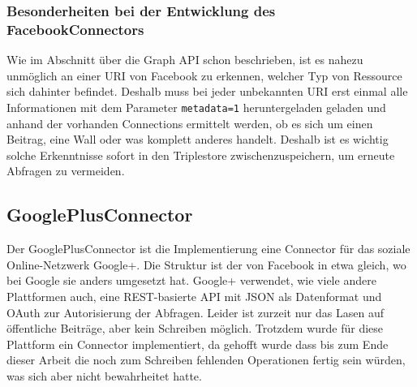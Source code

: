 
\subsubsection{Besonderheiten bei der Entwicklung des FacebookConnectors} %
\label{ssub:besonderheiten_bei_der_entwicklung_des_facebookconnectors}

Wie im Abschnitt über die Graph API schon beschrieben, ist es nahezu unmöglich an einer URI von Facebook zu erkennen, welcher Typ von Ressource sich dahinter befindet. Deshalb muss bei jeder unbekannten URI erst einmal alle Informationen mit dem Parameter \texttt{metadata=1} heruntergeladen geladen  und anhand der vorhanden Connections ermittelt werden, ob es sich um einen Beitrag, eine Wall oder was komplett anderes handelt. Deshalb ist es wichtig solche Erkenntnisse sofort in den Triplestore zwischenzuspeichern, um erneute Abfragen zu vermeiden.



\subsection{GooglePlusConnector} %
\label{sub:google_plus_connector}

Der GooglePlusConnector ist die Implementierung eine Connector für das soziale Online-Netzwerk Google+. Die Struktur ist der von Facebook in etwa gleich, wo bei Google sie anders umgesetzt hat. Google+ verwendet, wie viele andere Plattformen auch, eine REST-basierte API mit JSON als Datenformat und OAuth zur Autorisierung der Abfragen. Leider ist zurzeit nur das Lasen auf öffentliche Beiträge, aber kein Schreiben möglich. Trotzdem wurde für diese Plattform ein Connector implementiert, da gehofft wurde dass bis zum Ende dieser Arbeit die noch zum Schreiben fehlenden Operationen fertig sein würden, was sich aber nicht bewahrheitet hatte.


